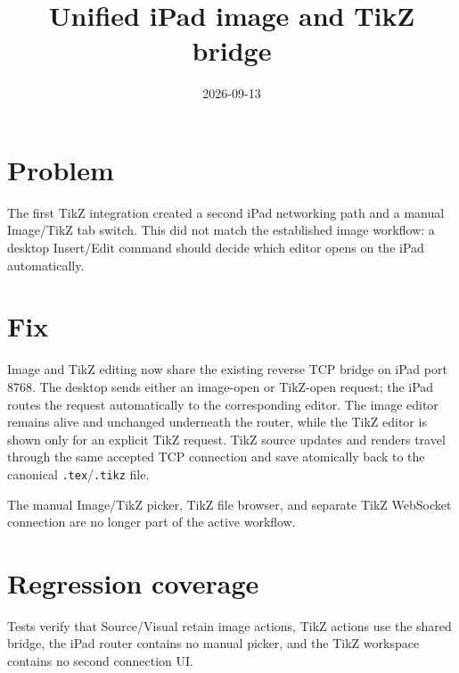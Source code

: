 \documentclass[a4paper]{article}
\title{Unified iPad image and TikZ bridge}
\date{2026-09-13}
\author{}
\begin{document}
\maketitle

\section*{Problem}
The first TikZ integration created a second iPad networking path and a manual Image/TikZ tab switch.  This did not match the established image workflow: a desktop Insert/Edit command should decide which editor opens on the iPad automatically.

\section*{Fix}
Image and TikZ editing now share the existing reverse TCP bridge on iPad port 8768.  The desktop sends either an image-open or TikZ-open request; the iPad routes the request automatically to the corresponding editor.  The image editor remains alive and unchanged underneath the router, while the TikZ editor is shown only for an explicit TikZ request.  TikZ source updates and renders travel through the same accepted TCP connection and save atomically back to the canonical \texttt{.tex}/\texttt{.tikz} file.

The manual Image/TikZ picker, TikZ file browser, and separate TikZ WebSocket connection are no longer part of the active workflow.

\section*{Regression coverage}
Tests verify that Source/Visual retain image actions, TikZ actions use the shared bridge, the iPad router contains no manual picker, and the TikZ workspace contains no second connection UI.
\end{document}
